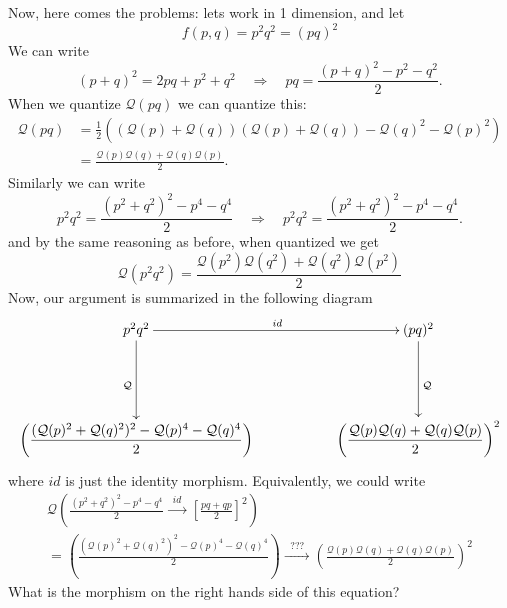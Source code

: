 Now, here comes the problems: lets work in 1 dimension, and let
\begin{equation}%
f(p,q) = p^{2}q^{2} = (pq)^2
\end{equation}
We can write
\begin{equation}%
(p+q)^{2} = 2pq + p^{2}+q^{2}\quad\Rightarrow\quad pq = \frac{(p+q)^{2}-p^{2}-q^{2}}{2}.
\end{equation}
When we quantize $\mathcal{Q}(pq)$ we can quantize this: 
\begin{subequations}
\begin{align}
\mathcal{Q}(pq)
&=\frac{1}{2}\left((\mathcal{Q}(p)+\mathcal{Q}(q))(\mathcal{Q}(p)+\mathcal{Q}(q))-\mathcal{Q}(q)^{2}-\mathcal{Q}(p)^{2}\right)\\
&= \frac{\mathcal{Q}(p)\mathcal{Q}(q)+\mathcal{Q}(q)\mathcal{Q}(p)}{2}.
\end{align}
\end{subequations}
Similarly we can write
\begin{equation}%
p^{2}q^{2} = \frac{(p^{2}+q^{2})^{2}-p^{4}-q^{4}}{2}\quad\Rightarrow\quad p^{2}q^{2} = \frac{(p^{2}+q^{2})^{2}-p^{4}-q^{4}}{2}.
\end{equation}
and by the same reasoning as before, when quantized we get
\begin{equation}%
\mathcal{Q}(p^{2}q^{2}) = \frac{\mathcal{Q}(p^{2})\mathcal{Q}(q^{2})+\mathcal{Q}(q^{2})\mathcal{Q}(p^{2})}{2}
\end{equation}
Now, our argument is summarized in the following diagram
\begin{equation*}
\vcenter{\xymatrix{
p^{2}q^{2} \ar[dd]_{\mathcal{Q}}\ar[rr]^{id}&& (pq)^{2}\ar[dd]^{\mathcal{Q}}\\
&&\\
\displaystyle\left(\frac{(\mathcal{Q}(p)^{2}+\mathcal{Q}(q)^{2})^{2}-\mathcal{Q}(p)^{4}-\mathcal{Q}(q)^{4}}{2}\right)&&\displaystyle\left(\frac{\mathcal{Q}(p)\mathcal{Q}(q)+\mathcal{Q}(q)\mathcal{Q}(p)}{2}\right)^{2}
}}
\end{equation*}
\noparskip\noindent where $id$ is just the identity
morphism. Equivalently, we could write
\begin{multline}
\mathcal{Q}\left(
\frac{(p^{2}+q^{2})^{2}-p^{4}-q^{4}}{2}
\xrightarrow{\;\;id\;\;}
\left[\frac{pq+qp}{2}\right]^{2}
\right)\\
=
\left(\frac{(\mathcal{Q}(p)^{2}+\mathcal{Q}(q)^{2})^{2}-\mathcal{Q}(p)^{4}-\mathcal{Q}(q)^{4}}{2}\right)
\xrightarrow{\;\;???\;\;}
\left(\frac{\mathcal{Q}(p)\mathcal{Q}(q)+\mathcal{Q}(q)\mathcal{Q}(p)}{2}\right)^{2}
\end{multline}
What is the morphism on the right hands side of this equation?

